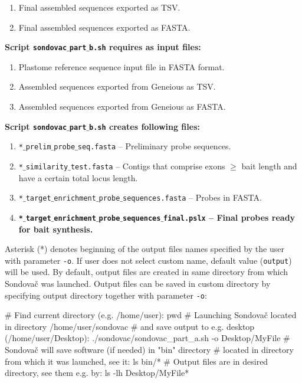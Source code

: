 \documentclass[a4paper, 11pt, twoside]{article}
\begin{document}
\begin{enumerate}
  \item Final assembled sequences exported as TSV.
  \item Final assembled sequences exported as FASTA.
\end{enumerate}

\textbf{Script \texttt{sondovac$\_$part$\_$b.sh} requires as input files:}

\begin{enumerate}
  \item Plastome reference sequence input file in FASTA format.
  \item Assembled sequences exported from Geneious as TSV.
  \item Assembled sequences exported from Geneious as FASTA.
\end{enumerate}

\textbf{Script \texttt{sondovac$\_$part$\_$b.sh} creates following files:}

\begin{enumerate}
  \item \texttt{*$\_$prelim$\_$probe$\_$seq.fasta} -- Preliminary probe sequences.
  \item \texttt{*$\_$similarity$\_$test.fasta} -- Contigs that comprise exons $\geq$ bait length and have a certain total locus length.
  \item \texttt{*$\_$target$\_$enrichment$\_$probe$\_$sequences.fasta} -- Probes in FASTA.
  \item \textbf{\texttt{*$\_$target$\_$enrichment$\_$probe$\_$sequences$\_$final.pslx} -- Final probes ready for bait synthesis.}
\end{enumerate}

Asterisk (*) denotes beginning of the output files names specified by the user with parameter \texttt{-o}. If user does not select custom name, default value (\texttt{output}) will be used. By default, output files are created in same directory from which Sondovač was launched. Output files can be saved in custom directory by specifying output directory together with parameter \texttt{-o}:

\begin{bashcode}
  # Find current directory (e.g. /home/user):
  pwd
  # Launching Sondovač located in directory /home/user/sondovac
  # and save output to e.g. desktop (/home/user/Desktop):
  ./sondovac/sondovac_part_a.sh -o Desktop/MyFile
  # Sondovač will save software (if needed) in "bin" directory
  # located in directory from which it was launched, see it:
  ls bin/*
  # Output files are in desired directory, see them e.g. by:
  ls -lh Desktop/MyFile*
\end{bashcode}
\end{document}
